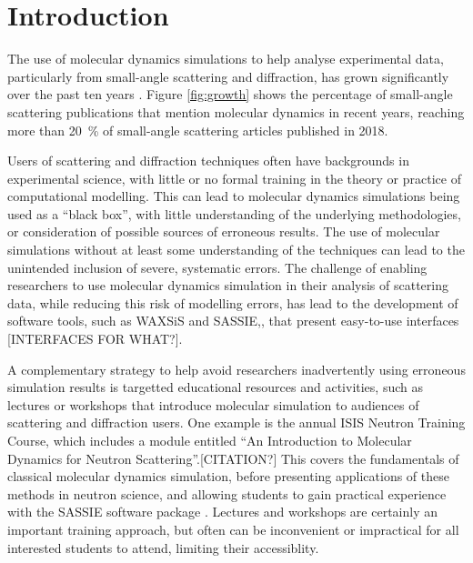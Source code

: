\documentclass[amsmath,amssymb,twocolumn,superscriptaddress]{revtex4-1}
\begin{document}
\maketitle                        %

\section{Introduction}

\noindent The use of molecular dynamics simulations to help analyse experimental data, particularly from small-angle scattering and diffraction, has grown significantly over the past ten years \cite{pan_molecular_2012,boldon_review_2015,hub_interpreting_2018,ivanovic_temperature-dependent_2018,east_structural_2016,wall_conformational_2014,wall_internal_2018,satoh_multiple_2015}.
Figure \ref{fig:growth} shows the percentage of small-angle scattering publications that mention molecular dynamics in recent years, reaching more than \SI{20}{\percent} of small-angle scattering articles published in 2018.

Users of scattering and diffraction techniques often have backgrounds in experimental science, with little or no formal training in the theory or practice of computational modelling.
This can lead to molecular dynamics simulations being used as a ``black box'', with little understanding of the underlying methodologies, or consideration of possible sources of erroneous results.
The use of molecular simulations without at least some understanding of the techniques can lead to the unintended inclusion of severe, systematic errors.
The challenge of enabling researchers to use molecular dynamics simulation in their analysis of scattering data, while reducing this risk of modelling errors, has lead to the development of software tools, such as WAXSiS and SASSIE,\cite{chen_validating_2014,knight_waxsis_2015,perkins_atomistic_2016}, that present easy-to-use interfaces [INTERFACES FOR WHAT?].

A complementary strategy to help avoid researchers inadvertently using erroneous simulation results is targetted educational resources and activities, such as lectures or workshops that introduce molecular simulation to audiences of scattering and diffraction users.
One example is the annual ISIS Neutron Training Course, which includes a module entitled ``An Introduction to Molecular Dynamics for Neutron Scattering''.[CITATION?]
This covers the fundamentals of classical molecular dynamics simulation, before presenting applications of these methods in neutron science, and allowing students to gain practical experience with the SASSIE software package \cite{perkins_atomistic_2016}.
Lectures and workshops are certainly an important training approach, but often can be inconvenient or impractical for all interested students to attend, limiting their accessiblity.
\end{document}

